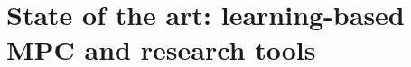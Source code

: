 \section{State of the art: learning-based MPC and research tools}
\cite{frameworks:mittal2023orbit}
\cite{frameworks:howell2022}
\cite{rudin2022learning}